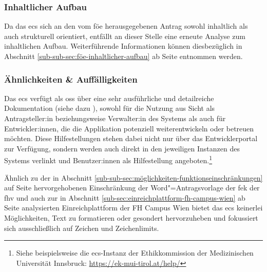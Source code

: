 \documentclass[a4paper,12pt,twoside]{scrreprt}
\begin{document}
\subsubsection*{Inhaltlicher Aufbau}
\label{sub-sub-sec:ecs-inhaltlicher-aufbau}

Da das \ac{ecs} sich an den vom \acl{föe} herausgegebenen Antrag sowohl inhaltlich als auch strukturell orientiert, entfällt an dieser Stelle eine erneute Analyse zum inhaltlichen Aufbau. Weiterführende Informationen können diesbezüglich in Abschnitt \ref{sub-sub-sec:föe-inhaltlicher-aufbau} ab Seite \pageref{sub-sub-sec:föe-inhaltlicher-aufbau} entnommen werden.

\subsubsection*{Ähnlichkeiten \& Auffälligkeiten}
\label{sub-sub-sec:ähnlichkeiten-auffälligkeiten-ecs}

Das \acl{ecs} verfügt als \ac{oss} über eine sehr ausführliche und detailreiche Dokumentation (siehe dazu \cite{medizinische_universitat_wien_ecs-docs_about-2021, medizinische_universitat_wien_development_2021, medizinische_universitat_wien_installationusage_2021, medizinische_universitat_wien_ecs-handbook_development-2021, ethics_commission_system_organization_ecs_2021}), sowohl für die Nutzung aus Sicht als Antragsteller:in beziehungsweise Verwalter:in des Systems als auch für Entwickler:innen, die die Applikation potenziell weiterentwickeln oder betreuen möchten. Diese Hilfestellungen stehen dabei nicht nur über das Entwicklerportal zur Verfügung, sondern werden auch direkt in den jeweiligen Instanzen des Systems verlinkt und Benutzer:innen als Hilfestellung angeboten.\footnote{Siehe beispielsweise die \ac{ecs}-Instanz der Ethikkommission der Medizinischen Universität Innsbruck: \url{https://ek-mui-tirol.at/help/}}

\medskip

Ähnlich zu der in Abschnitt \ref{sub-sub-sec:möglichkeiten-funktionseinschränkungen} auf Seite \pageref{sub-sub-sec:möglichkeiten-funktionseinschränkungen} hervorgehobenen Einschränkung der Word"=Antragsvorlage der \ac{fek} der \ac{fhv} und auch zur in Abschnitt \ref{sub-sec:einreichplattform-fh-campus-wien} ab Seite \pageref{sub-sec:einreichplattform-fh-campus-wien} analysierten Einreichplattform der FH Campus Wien bietet das \acl{ecs} keinerlei Möglichkeiten, Text zu formatieren oder gesondert hervorzuheben und fokussiert sich ausschließlich auf Zeichen und Zeichenlimits.
\end{document}
